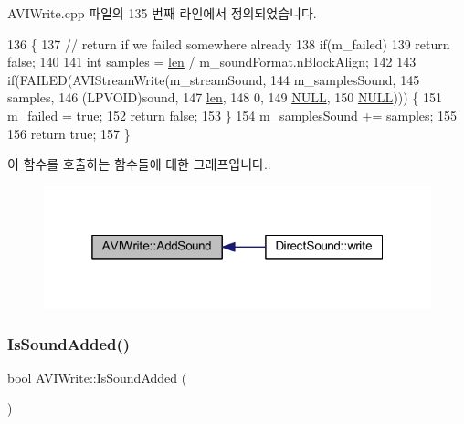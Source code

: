 A\+V\+I\+Write.\+cpp 파일의 135 번째 라인에서 정의되었습니다.


\begin{DoxyCode}
136 \{
137   \textcolor{comment}{// return if we failed somewhere already}
138   \textcolor{keywordflow}{if}(m\_failed)
139     \textcolor{keywordflow}{return} \textcolor{keyword}{false};
140 
141   \textcolor{keywordtype}{int} samples = \mbox{\hyperlink{expr-lex_8cpp_afed088663f8704004425cdae2120b9b3}{len}} / m\_soundFormat.nBlockAlign;
142 
143   \textcolor{keywordflow}{if}(FAILED(AVIStreamWrite(m\_streamSound,
144                            m\_samplesSound,
145                            samples,
146                            (LPVOID)sound,
147                            \mbox{\hyperlink{expr-lex_8cpp_afed088663f8704004425cdae2120b9b3}{len}},
148                            0,
149                            \mbox{\hyperlink{getopt1_8c_a070d2ce7b6bb7e5c05602aa8c308d0c4}{NULL}},
150                            \mbox{\hyperlink{getopt1_8c_a070d2ce7b6bb7e5c05602aa8c308d0c4}{NULL}}))) \{
151     m\_failed = \textcolor{keyword}{true};
152     \textcolor{keywordflow}{return} \textcolor{keyword}{false};
153   \}
154   m\_samplesSound += samples;
155 
156   \textcolor{keywordflow}{return} \textcolor{keyword}{true};
157 \}
\end{DoxyCode}
이 함수를 호출하는 함수들에 대한 그래프입니다.\+:
\nopagebreak
\begin{figure}[H]
\begin{center}
\leavevmode
\includegraphics[width=319pt]{class_a_v_i_write_a63b7d54c048e517bbfad0ae2004d9861_icgraph}
\end{center}
\end{figure}
\mbox{\label{class_a_v_i_write_a7e14c1640c3c888c2b0a0b042c0d5b8f}} 
\subsubsection{\texorpdfstring{Is\+Sound\+Added()}{IsSoundAdded()}}
{\footnotesize\ttfamily bool A\+V\+I\+Write\+::\+Is\+Sound\+Added (\begin{DoxyParamCaption}{ }\end{DoxyParamCaption})}



